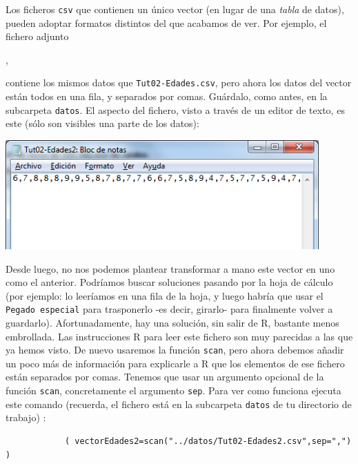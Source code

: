 \documentclass[10pt,a4paper]{article}\usepackage[]{graphicx}\usepackage[]{color}
\newcounter {cont01}
\begin{document}
Los ficheros {\tt  csv} que contienen un único vector (en lugar de una {\em tabla} de datos), pueden adoptar formatos distintos del que acabamos de ver. Por ejemplo, el fichero adjunto
\begin{center}
  ,
\end{center}
contiene los mismos datos que {\tt Tut02-Edades.csv}, pero ahora los datos del vector están todos en una fila, y separados por comas. Guárdalo, como antes, en la subcarpeta {\tt datos}. El aspecto del fichero, visto a través de un editor de texto, es este (sólo son visibles una parte de los datos):
    \begin{center}
    \includegraphics[width=12cm]{../fig/Tut02-07a.png}
    \end{center}
Desde luego, no nos podemos plantear transformar a mano este vector en uno como el anterior. Podríamos buscar soluciones pasando por la hoja de cálculo (por ejemplo: lo leeríamos en una fila de la hoja, y luego habría que usar el {\tt Pegado especial} para trasponerlo -es decir, girarlo- para finalmente volver a guardarlo). Afortunadamente, hay una solución, sin salir de R, bastante menos embrollada. Las instrucciones R para leer este fichero son muy parecidas a las que ya hemos visto. De nuevo usaremos la función {\tt scan}, pero ahora debemos añadir un poco más de información para explicarle a R que los elementos de ese fichero están separados por comas. Tenemos que usar un argumento opcional de la función {\tt scan}, concretamente el argumento {\tt sep}. Para ver como funciona ejecuta este comando (recuerda, el fichero está en la subcarpeta {\tt datos} de tu directorio de trabajo) :
\begin{verbatim}
            ( vectorEdades2=scan("../datos/Tut02-Edades2.csv",sep=",") )
\end{verbatim}
%
\end{document}
